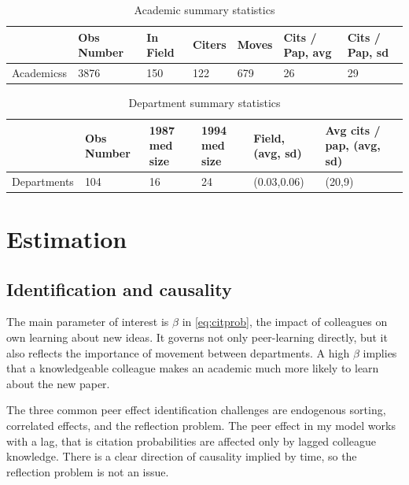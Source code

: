 \begin{table}[!ht]
    \centering
    \begin{tabular}{lllllll}
        \hline
                 & Obs Number & In Field & Citers & Moves & Cits / Pap, avg & Cits / Pap, sd \\ \hline \hline
        Academicss  & 3876       & 150      & 122    & 679   & 26              & 29             \\ \hline
    \end{tabular}
    \caption{Academic summary statistics}
    \label{tab:aut_sum}
\end{table}

\begin{table}[!ht]
    \centering
    \begin{tabular}{lllllll}
        \hline
                    & Obs Number & 1987 med size & 1994 med size & Field, (avg, sd) & Avg cits / pap, (avg, sd) \\ \hline\hline
        Departments & 104        & 16               & 24               & (0.03,0.06)           & (20,9) \\ \hline
    \end{tabular}
    \caption{Department summary statistics}
    \label{tab:dep_sum}
\end{table}

\section{Estimation}

\subsection{Identification and causality}
\label{sec:ident}

The main parameter of interest is $\beta$ in \eqref{eq:citprob}, the
impact of colleagues on own learning about new ideas. It
governs not only peer-learning directly, but it also reflects the importance 
of movement between departments.  A high $\beta$ implies that a knowledgeable
colleague makes an academic much more likely to learn about the new paper.

The three common peer effect identification challenges are endogenous sorting,
correlated effects, and the reflection problem.  The peer effect in my
model works with a lag, that is citation probabilities are affected only by 
lagged colleague knowledge.  There is a clear direction of 
causality implied by time, so the reflection problem is not an issue.

